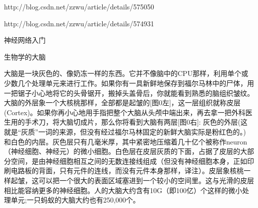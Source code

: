 http://blog.csdn.net/zzwu/article/details/575050

http://blog.csdn.net/zzwu/article/details/574931

神经网络入门


生物学的大脑

大脑是一块灰色的、像奶冻一样的东西。它并不像脑中的CPU那样，利用单个或少数几个处理单元来进行工作。如果你有一具新鲜地保存到福尔马林中的尸体，用一把锯子小心地将它的头骨锯开，搬掉头盖骨后，你就能看到熟悉的脑组织皱纹。大脑的外层象一个大核桃那样，全部都是起皱的[图0左]，这一层组织就称皮层(Cortex)。如果你再小心地用手指把整个大脑从头颅中端出来，再去拿一把外科医生用的手术刀，将大脑切成片，那么你将看到大脑有两层[图0右]: 灰色的外层(这就是“灰质”一词的来源，但没有经过福尔马林固定的新鲜大脑实际是粉红色的。) 和白色的内层。灰色层只有几毫米厚，其中紧密地压缩着几十亿个被称作neuron（神经细胞、神经元）的微小细胞。白色层在皮层灰质的下面，占据了皮层的大部分空间，是由神经细胞相互之间的无数连接线组成（但没有神经细胞本身，正如印刷电路板的背面，只有元件的连线，而没有元件本身那样，译注）。皮层象核桃一样起皱，这可以把一个很大的表面区域塞进到一个较小的空间里。这与光滑的皮层相比能容纳更多的神经细胞。人的大脑大约含有10G（即100亿）个这样的微小处理单元;一只蚂蚁的大脑大约也有250,000个。 
